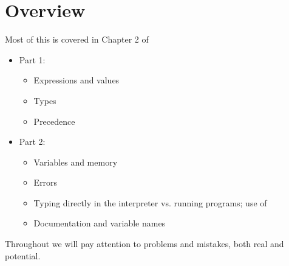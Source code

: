 \documentclass[letterpaper,10pt,english]{sphinxmanual}
\begin{document}
\section{Overview}
\label{\detokenize{lecture_notes/lec02_calculator:overview}}
Most of this is covered in Chapter 2 of 
\begin{itemize}
\item {} 
Part 1:
\begin{itemize}
\item {} 
Expressions and values

\item {} 
Types

\item {} 
Precedence

\end{itemize}

\item {} 
Part 2:
\begin{itemize}
\item {} 
Variables and memory

\item {} 
Errors

\item {} 
Typing directly in the interpreter vs. running programs; use of 

\item {} 
Documentation and variable names

\end{itemize}

\end{itemize}

Throughout we will pay attention to problems and mistakes, both real and
potential.
\end{document}
